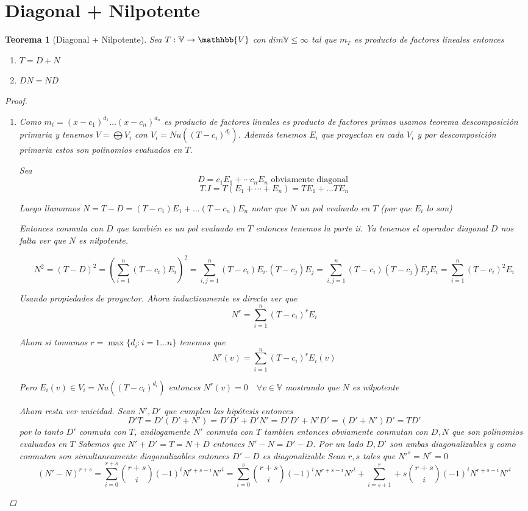 \documentclass{article}
\theoremstyle{break}
\newtheorem{theorem}{Teorema}[section]
\begin{document}
\section{Diagonal + Nilpotente}
\begin{theorem}[Diagonal + Nilpotente]
  Sea $T: \mathbb{V}\rightarrow \mathhbb{V}$ con $dim\mathbb{V} \leq \infty$ tal que $m_T$ es producto de factores lineales entonces
  \begin{enumerate}
    \item $T = D+N$
    \item $DN = ND$
  \end{enumerate}

  \begin{proof}
    \begin{enumerate}
      \item Como $m_t=(x-c_1)^{d_1}\ldots (x-c_n)^{d_n} $ es producto de factores lineales es producto de factores primos usamos teorema descomposición primaria y tenemos
        $V = \bigoplus V_i$ con $V_i = Nu((T-c_i)^{d_i})$. Además tenemos $E_i$ que proyectan en cada $V_i$ y por descomposición primaria
        estos son polinomios evaluados en $T$.

        Sea $$D= c_1E_1 + \cdots c_nE_n \text{ obviamente diagonal }$$ 
        $$T.I = T(E_1 + \cdots + E_n) = TE_1 + \ldots TE_n$$

        Luego llamamos $N = T - D = (T-c_1)E_1 + \ldots (T-c_n)E_n$ notar que $N$ un pol evaluado en $T$ (por que $E_i$ lo son)

        Entonces conmuta con $D$ que también es un pol evaluado en $T$ entonces tenemos la parte ii. Ya tenemos el operador diagonal $D$
        nos falta ver que $N$ es nilpotente.

        $$ N^2 = (T-D)^2 = (\sum_{i=1}^n (T-c_i)E_i)^2 = \sum_{i,j=1}^n (T-c_i)E_i.(T-c_j)E_j =\sum_{i,j=1}^n (T-c_i)(T-c_j)E_jE_i = 
        \sum_{i=1}^n (T-c_i)^2E_i$$

        Usando propiedades de proyector. Ahora inductivamente es directo ver que $$N^r = \sum_{i=1}^n (T-c_i)^rE_i$$

        Ahora si tomamos $r = \max \{d_i: i=1\ldots n\}$ tenemos que $$N^r(v) = \sum_{i=1}^n (T-c_i)^rE_i(v)$$

        Pero $E_i(v) \in V_i = Nu((T-c_i)^{d_i})$ entonces $N^r(v) = 0 \quad \forall v \in \mathbb{V}$ mostrando que $N$ es nilpotente 

        Ahora resta ver unicidad. Sean $N', D'$ que cumplen las hipótesis entonces 
        $$D'T = D'(D'+N') = D'D' + D'N' = D'D' + N'D' = (D'+N')D'=TD' $$ por lo tanto $D'$ conmuta con $T$, análogamente
        $N'$ conmuta con $T$ tambien entonces obviamente conmutan con $D,N$ que son polinomios evaluados en $T$
        Sabemos que $N'+D' = T  = N + D$ entonces $N' - N = D' - D$. Por un lado $D,D'$ son
        ambas diagonalizables y como conmutan son simultaneamente diagonalizables entonces $D' - D $ es diagonalizable
        Sean $r,s$ tales que $N'^s = N^r = 0$
        $$(N' - N)^{r+s} = \sum_{i=0}^{r+s} \binom{r+s}{i} (-1)^{i}N^{r+s - i}N'^i = 
        \sum_{i=0}^s \binom{r+s}{i} (-1)^{i}N^{r+s - i}N'^i + \sum_{i = s+1}^r+s \binom{r+s}{i} (-1)^{i}N^{r+s - i}N'^i$$


\end{enumerate}
\end{proof}
\end{theorem}
\end{document}
